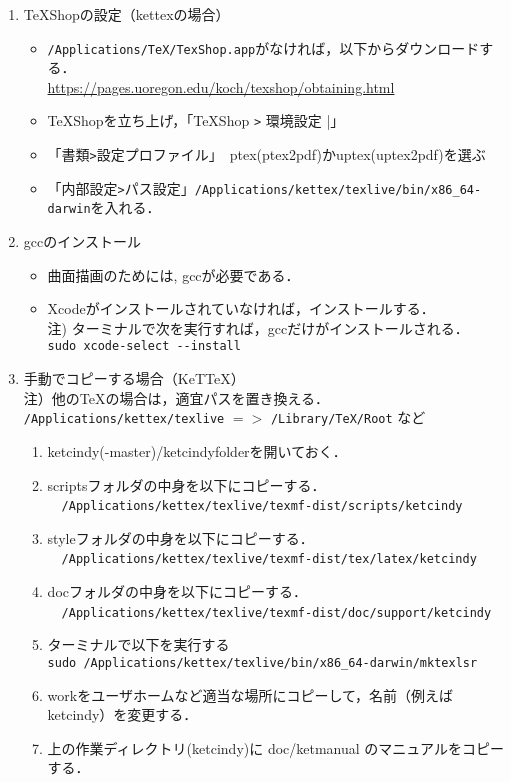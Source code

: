 \documentclass{ujarticle}
\begin{document}
\begin{enumerate}[\bf\large 1.]
\item TeXShopの設定（kettexの場合）
  \begin{itemize}
  \item \verb|/Applications/TeX/TexShop.app|がなければ，以下からダウンロードする．\\
  \hspace*{5mm}\url{https://pages.uoregon.edu/koch/texshop/obtaining.html}
  \item TeXShopを立ち上げ，「TeXShop \verb|>| 環境設定 |」
  \item 「書類\verb|>|設定プロファイル」　ptex(ptex2pdf)かuptex(uptex2pdf)を選ぶ
  \item 「内部設定\verb|>|パス設定」\verb|/Applications/kettex/texlive/bin/x86_64-darwin|を入れる．
  \end{itemize}

\item gccのインストール
  \begin{itemize}
    \item 曲面描画のためには, gccが必要である．
    \item Xcodeがインストールされていなければ，インストールする．\\
    \hspace*{5mm}注) ターミナルで次を実行すれば，gccだけがインストールされる．\\
    \hspace*{20mm}\verb|sudo xcode-select --install|
  \end{itemize}

\item 手動でコピーする場合（KeTTeX）\\
\hspace*{1zw}注）他のTeXの場合は，適宜パスを置き換える．\\
\hspace*{3zw}\verb|/Applications/kettex/texlive| $=>$ \verb|/Library/TeX/Root| など
  \begin{enumerate}[(1)]
  \item ketcindy(-master)/ketcindyfolderを開いておく．
  \item scriptsフォルダの中身を以下にコピーする．\\
　\verb|/Applications/kettex/texlive/texmf-dist/scripts/ketcindy|
  \item styleフォルダの中身を以下にコピーする．\\
　\verb|/Applications/kettex/texlive/texmf-dist/tex/latex/ketcindy|
  \item docフォルダの中身を以下にコピーする．\\
　\verb|/Applications/kettex/texlive/texmf-dist/doc/support/ketcindy|
  \item ターミナルで以下を実行する\\
  \hspace*{1zw}\verb|sudo /Applications/kettex/texlive/bin/x86_64-darwin/mktexlsr|
  \item workをユーザホームなど適当な場所にコピーして，名前（例えばketcindy）を変更する．
  \item 上の作業ディレクトリ(ketcindy)に doc/ketmanual のマニュアルをコピーする．
  \end{enumerate}


\end{enumerate}
\end{document}
